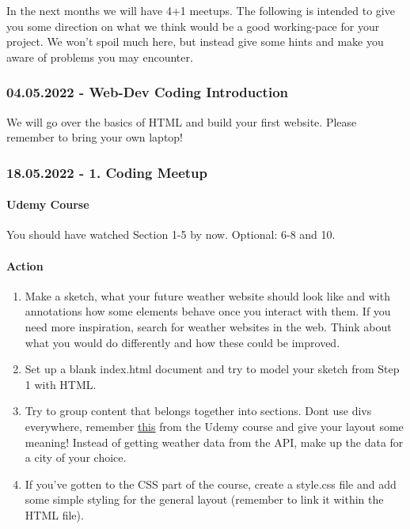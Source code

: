 \documentclass[
]{article}
\providecommand{\tightlist}{%
  \setlength{\itemsep}{0pt}\setlength{\parskip}{0pt}}
\begin{document}
In the next months we will have 4+1 meetups. The following is intended to give you some direction on what we think would be a good working-pace for your project. We won't spoil much here, but instead give some hints and make you aware of problems you may encounter.

\hypertarget{web-dev-coding-introduction}{%
\subsubsection*{04.05.2022 - Web-Dev Coding Introduction}\label{web-dev-coding-introduction}}

We will go over the basics of HTML and build your first website. Please remember to bring your own laptop!

\hypertarget{coding-meetup}{%
\subsubsection*{18.05.2022 - 1. Coding Meetup}\label{coding-meetup}}

\hypertarget{udemy-course}{%
\paragraph*{Udemy Course}\label{udemy-course}}

You should have watched Section 1-5 by now. Optional: 6-8 and 10.

\hypertarget{action}{%
\paragraph*{Action}\label{action}}

\begin{enumerate}
\def\labelenumi{\arabic{enumi}.}
\tightlist
\item
  Make a sketch, what your future weather website should look like and with annotations how some elements behave once you interact with them. If you need more inspiration, search for weather websites in the web. Think about what you would do differently and how these could be improved.\\
\item
  Set up a blank index.html document and try to model your sketch from Step 1 with HTML.
\item
  Try to group content that belongs together into sections. Dont use divs everywhere, remember \href{https://www.udemy.com/course/the-web-developer-bootcamp/learn/lecture/21919368\#overview}{this} from the Udemy course and give your layout some meaning! Instead of getting weather data from the API, make up the data for a city of your choice.
\item
  If you've gotten to the CSS part of the course, create a style.css file and add some simple styling for the general layout (remember to link it within the HTML file).
\end{enumerate}
\end{document}
